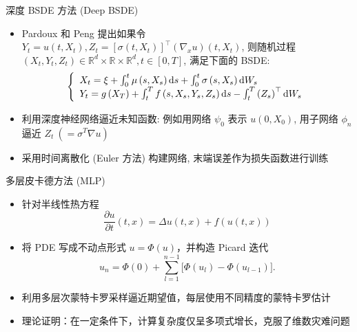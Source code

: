 \documentclass[aspectratio=169]{beamer}
\def\dif{\mathinner{\mathrm{d}}\hphantom{\mskip-\thinmuskip}}
\begin{document}
	\begin{frame}{深度 BSDE 方法 (Deep BSDE)}
			\begin{itemize}
				\item Pardoux 和 Peng 提出如果令 $Y_{t} = u\left(t, X_{t}\right), Z_{t} = \left[\sigma\left(t, X_{t}\right)\right]^{\top} \left(\nabla_{x} u \right)\left(t, X_{t}\right)$, 则随机过程 $\left(X_{t}, Y_{t}, Z_{t}\right) \in \mathbb{R}^{d} \times \mathbb{R} \times \mathbb{R}^d, t \in \left[0, T\right]$, 满足下面的 BSDE:
					\begin{equation*}
						\left\{\begin{array}{l}
							X_{t} = \xi + \int_{0}^{t} \mu\left(s, X_{s}\right) \dif s + \int_{0}^{t} \sigma\left(s, X_{s}\right) \dif W_{s} \\
							Y_{t} = g\left(X_{T}\right) + \int_{t}^{T} f\left(s, X_{s}, Y_{s}, Z_{s}\right) \dif s - \int_{t}^{T} \left(Z_{s}\right)^{\top} \dif W_{s}
						\end{array}\right.
					\end{equation*}
				\item 利用深度神经网络逼近未知函数: 例如用网络 $\psi_{0}$ 表示 $u(0, X_0)$, 用子网络 $\phi_n$ 逼近 $Z_t\ (= \sigma^T\nabla u)$
				\item 采用时间离散化 (Euler 方法) 构建网络, 末端误差作为损失函数进行训练
			\end{itemize}
	\end{frame}

	\begin{frame}{多层皮卡德方法 (MLP)}
		\begin{itemize}
			\item 针对半线性热方程
				\begin{equation*}
				\frac{\partial u}{\partial t}(t,x)=\Delta u(t,x)+f(u(t,x))
				\end{equation*}
			\item 将 PDE 写成不动点形式 \(u = \Phi(u)\)，并构造 Picard 迭代
				\begin{equation*}
				u_n = \Phi(0) + \sum_{l=1}^{n-1} \bigl[\Phi(u_l)-\Phi(u_{l-1})\bigr].
				\end{equation*}
			\item 利用多层次蒙特卡罗采样逼近期望值，每层使用不同精度的蒙特卡罗估计
			\item 理论证明：在一定条件下，计算复杂度仅呈多项式增长，克服了维数灾难问题
		\end{itemize}
	\end{frame}
\end{document}
